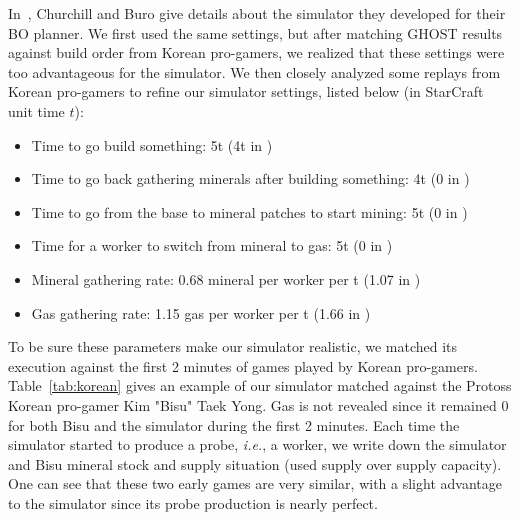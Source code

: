 \documentclass[journal]{IEEEtran}
\newcommand{\ghost}{\textsc{GHOST}\xspace}
\newcommand{\ie}{\textit{i.e.}}
\begin{document}
In~\cite{ChurchillB11},  Churchill and  Buro  give  details about  the
simulator they developed for their BO planner.  We first used
the same  settings, but  after matching  \ghost results  against build
order from Korean pro-gamers, we realized that these settings were too
advantageous for the simulator.  We then closely analyzed some replays
from Korean pro-gamers to refine  our simulator settings, listed below
(in StarCraft unit time $t$):
\begin{itemize}
\item Time to go build something: 5t (4t in \cite{ChurchillB11})
\item Time to go back  gathering minerals after building something: 4t
  (0 in \cite{ChurchillB11})
\item Time to go from the base  to mineral patches to start mining: 5t
  (0 in \cite{ChurchillB11})
\item  Time for  a worker  to  switch from  mineral  to gas:  5t (0  in
  \cite{ChurchillB11})
\item Mineral gathering  rate: 0.68 mineral per worker per  t (1.07 in
  \cite{ChurchillB11})
\item  Gas  gathering  rate:  1.15  gas per  worker  per  t  (1.66  in
  \cite{ChurchillB11})
\end{itemize}
To be sure these parameters make our simulator realistic, we matched its
execution  against the  first  2  minutes of  games  played by  Korean
pro-gamers. Table~\ref{tab:korean}  gives an  example of  our simulator
matched against the Protoss Korean pro-gamer Kim "Bisu" Taek Yong. Gas
is not revealed since it remained 0 for both Bisu and the simulator
during the first 2 minutes. Each time the simulator started to produce
a probe, \ie,  a worker, we write down the  simulator and Bisu mineral
stock and supply situation (used supply over supply capacity). One can
see  that  these two  early  games  are  very  similar, with  a  slight
advantage  to  the simulator  since  its  probe production  is  nearly
perfect.
\end{document}
